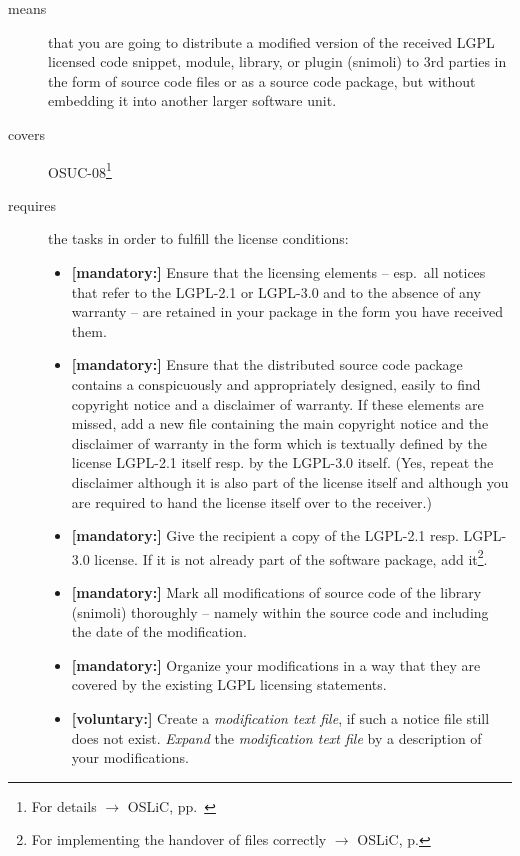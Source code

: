 \begin{description}
\item[means] that you are going to distribute a modified version of the received
LGPL licensed code snippet, module, library, or plugin (snimoli) to 3rd parties
in the form of source code files or as a source code package, but without
embedding it into another larger software unit.
\item[covers] OSUC-08\footnote{For details $\rightarrow$ OSLiC, pp.\ \pageref{OSUC-08-DEF}}
\item[requires] the tasks in order to fulfill the license conditions:
\begin{itemize}
 
   \item \textbf{[mandatory:]} Ensure that the licensing elements -- esp.\ all
  notices that refer to the LGPL-2.1 or LGPL-3.0 and to the absence of any
  warranty -- are retained in your package in the form you have received them.

  \item \textbf{[mandatory:]} Ensure that the distributed source code package
  contains a conspicuously and appropriately designed, easily to find copyright
  notice and a disclaimer of warranty. If these elements are missed, add a new
  file containing the main copyright notice and the disclaimer of warranty in the
  form which is textually defined by the license LGPL-2.1 itself resp. by the
  LGPL-3.0 itself. (Yes, repeat the disclaimer although it is also part of the
  license itself and although you are required to hand the license itself over
  to the receiver.)
  
  \item \textbf{[mandatory:]} Give the recipient a copy of the LGPL-2.1 resp.
  LGPL-3.0 license. If it is not already part of the software package, add
  it\footnote{For implementing the handover of files correctly $\rightarrow$
  OSLiC, p. \pageref{DistributingFilesHint}}.
  
  \item \textbf{[mandatory:]} Mark all modifications of source code of the
  library (snimoli) thoroughly -- namely within the source code and including
  the date of the modification.
  
  \item \textbf{[mandatory:]} Organize your modifications in a way that they are
  covered by the existing LGPL licensing statements.
    
  \item \textbf{[voluntary:]} Create a \emph{modification text file}, if such a
  notice file still does not exist. \emph{Expand} the \emph{modification text
  file} by a description of your modifications.
  

\end{itemize}
\end{description}
